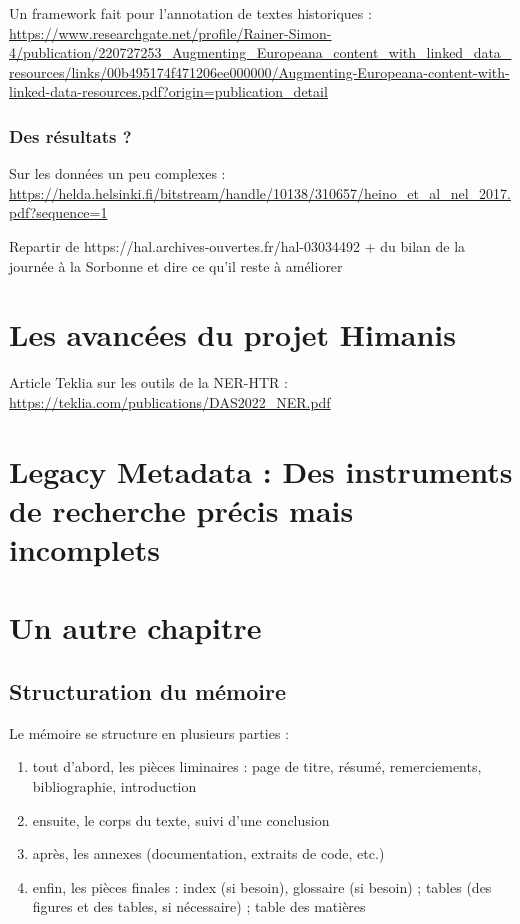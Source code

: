 \documentclass[a4paper,12pt,twoside]{book}
\begin{document}
	Un framework fait pour l'annotation de textes historiques : \url{https://www.researchgate.net/profile/Rainer-Simon-4/publication/220727253_Augmenting_Europeana_content_with_linked_data_resources/links/00b495174f471206ee000000/Augmenting-Europeana-content-with-linked-data-resources.pdf?origin=publication_detail}
	
	\subsection{Des résultats ?}
	
	Sur les données un peu complexes : \url{https://helda.helsinki.fi/bitstream/handle/10138/310657/heino_et_al_nel_2017.pdf?sequence=1}
	
	Repartir de 	https://hal.archives-ouvertes.fr/hal-03034492 + du bilan de la journée à la Sorbonne et dire ce qu'il reste à améliorer
	
	\chapter{Les avancées du projet Himanis}
	
	Article Teklia sur les outils de la NER-HTR : \url{https://teklia.com/publications/DAS2022_NER.pdf}
	
	\chapter{Legacy Metadata : Des instruments de recherche précis mais incomplets}
	
	\chapter{Un autre chapitre}
	
	\section{Structuration du mémoire}
	
	Le mémoire se structure en plusieurs parties :
	\begin{enumerate}
		\item tout d'abord, les pièces liminaires : page de titre, résumé, remerciements, bibliographie, introduction
		\item ensuite, le corps du texte, suivi d'une conclusion
		\item après, les annexes (documentation, extraits de code, etc.)
		\item enfin, les pièces finales : index (si besoin), glossaire (si besoin) ; tables (des figures et des tables, si nécessaire) ; table des matières
	\end{enumerate}
	
\end{document}
